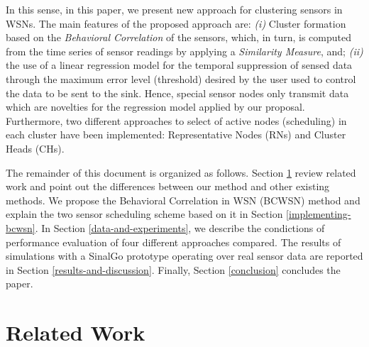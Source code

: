 \documentclass[conference]{IEEEtran}
\begin{document}
In this sense, in this paper, we present new approach for clustering sensors in
WSNs. The main features of the proposed approach are: {\it (i)} Cluster
formation based on the \textit{Behavioral Correlation} of the sensors, which, in
turn, is computed from the time series of sensor readings by applying a
\textit{Similarity Measure}, and; {\it (ii)} the use of a linear regression
model for the temporal suppression of sensed data through the maximum error
level (threshold) desired by the user used to control the data to be sent to the
sink. Hence, special sensor nodes only transmit data which are novelties for the
regression model applied by our proposal. Furthermore, two different approaches
to select of active nodes (scheduling) in each cluster have been implemented:
Representative Nodes (RNs) and Cluster Heads (CHs).




The remainder of this document is organized as follows. Section
\ref{related-work} review related work and point out the differences between our
method and other existing methods. We propose the Behavioral Correlation in WSN
(BCWSN) method and explain the two sensor scheduling scheme based on it in
Section \ref{implementing-bcwsn}. In Section \ref{data-and-experiments}, we
describe the condictions of performance evaluation of four different approaches
compared. The results of simulations with a SinalGo \cite{Sinalgo2007} prototype
operating over real sensor data are reported in Section
\ref{results-and-discussion}. Finally, Section \ref{conclusion} concludes the
paper.


\section{Related Work}
\label{related-work}
\end{document}
